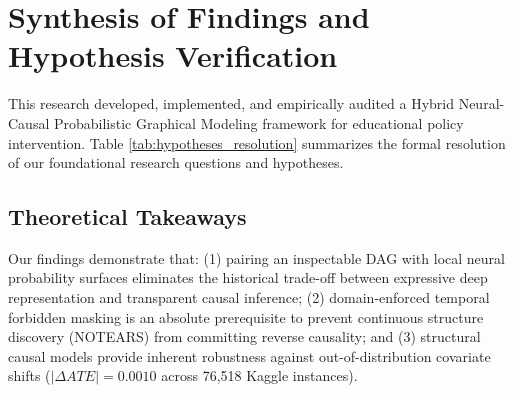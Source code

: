 \section{Synthesis of Findings and Hypothesis Verification}
\label{sec:concl_summary}

This research developed, implemented, and empirically audited a Hybrid Neural-Causal Probabilistic Graphical Modeling framework for educational policy intervention. Table \ref{tab:hypotheses_resolution} summarizes the formal resolution of our foundational research questions and hypotheses.

\begin{table}[htbp]
    \centering
    \small
    \caption{Systematic Verification of Research Questions and Scientific Hypotheses.}
    \label{tab:hypotheses_resolution}
\end{table}

\subsection{Theoretical Takeaways}
Our findings demonstrate that: (1) pairing an inspectable DAG with local neural probability surfaces eliminates the historical trade-off between expressive deep representation and transparent causal inference; (2) domain-enforced temporal forbidden masking is an absolute prerequisite to prevent continuous structure discovery (NOTEARS) from committing reverse causality; and (3) structural causal models provide inherent robustness against out-of-distribution covariate shifts ($|\Delta ATE| = 0.0010$ across 76,518 Kaggle instances).
